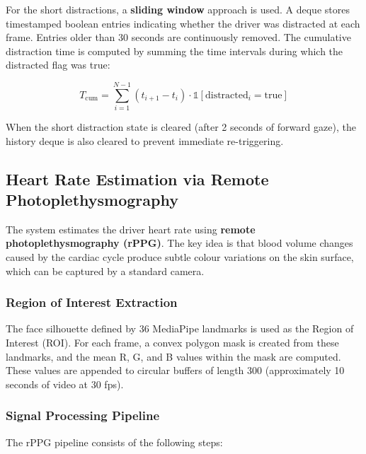 \documentclass[12pt,a4paper]{article}
\begin{document}
For the short distractions, a \textbf{sliding window} approach is used. A deque stores timestamped boolean entries indicating whether the driver was distracted at each frame. Entries older than 30 seconds are continuously removed. The cumulative distraction time is computed by summing the time intervals during which the distracted flag was true:

\begin{equation}
    T_{\text{cum}} = \sum_{i=1}^{N-1} (t_{i+1} - t_i) \cdot \mathbb{1}[\text{distracted}_i = \text{true}]
\end{equation}

When the short distraction state is cleared (after 2 seconds of forward gaze), the history deque is also cleared to prevent immediate re-triggering.

\subsection{Heart Rate Estimation via Remote Photoplethysmography}\label{subsec:rppg}

The system estimates the driver heart rate using \textbf{remote photoplethysmography (rPPG)}. The key idea is that blood volume changes caused by the cardiac cycle produce subtle colour variations on the skin surface, which can be captured by a standard camera.

\subsubsection{Region of Interest Extraction}

The face silhouette defined by 36 MediaPipe landmarks is used as the Region of Interest (ROI). For each frame, a convex polygon mask is created from these landmarks, and the mean R, G, and B values within the mask are computed. These values are appended to circular buffers of length 300 (approximately 10 seconds of video at 30 fps).

\subsubsection{Signal Processing Pipeline}

The rPPG pipeline consists of the following steps:
\end{document}
